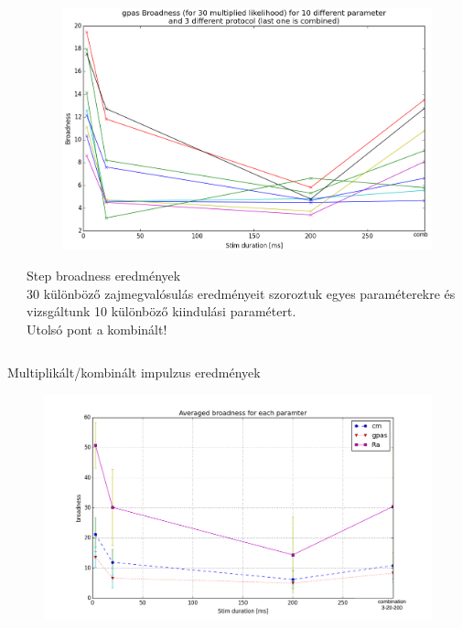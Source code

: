 \documentclass{beamer}
\begin{document}
\begin{darkframes}
\begin{frame}
\begin{columns}[T]
\begin{column}{.5\textwidth}
	\end{column}
	\begin{column}{.5\textwidth}
		\begin{figure}
			\centering
			\includegraphics[width=\textwidth]{comb/steps/gpas_brod.png}
		\end{figure}
		\alert{Step broadness eredmények}\\
		30 különböző zajmegvalósulás eredményeit szoroztuk egyes paraméterekre és vizsgáltunk 10 különböző kiindulási paramétert.\\
		\alert{Utolsó pont a kombinált!}
		
	\end{column}
\end{columns}
\end{frame}


\begin{frame}{Multiplikált/kombinált impulzus eredmények}
\begin{figure}
	\centering
	\includegraphics[width=\textwidth]{comb/steps/avrg_broadness.png}
\end{figure}
\end{frame}




\end{darkframes}
\end{document}
